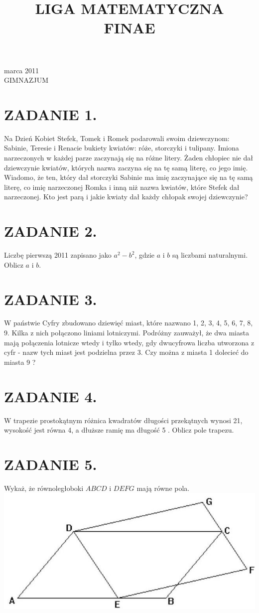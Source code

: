 \documentclass[10pt]{article}
\title{LIGA MATEMATYCZNA \\
 FINAE }
\author{}
\date{}
\begin{document}
 marca 2011\\
GIMNAZJUM

\section*{ZADANIE 1.}
Na Dzień Kobiet Stefek, Tomek i Romek podarowali swoim dziewczynom: Sabinie, Teresie i Renacie bukiety kwiatów: róże, storczyki i tulipany. Imiona narzeczonych w każdej parze zaczynają się na różne litery. Żaden chłopiec nie dał dziewczynie kwiatów, których nazwa zaczyna się na tę samą literę, co jego imię. Wiadomo, że ten, który dał storczyki Sabinie ma imię zaczynające się na tę samą literę, co imię narzeczonej Romka i inną niż nazwa kwiatów, które Stefek dał narzeczonej. Kto jest parą i jakie kwiaty dał każdy chłopak swojej dziewczynie?

\section*{ZADANIE 2.}
Liczbę pierwszą 2011 zapisano jako \(a^{2}-b^{2}\), gdzie \(a\) i \(b\) są liczbami naturalnymi. Oblicz \(a\) i \(b\).

\section*{ZADANIE 3.}
W państwie Cyfry zbudowano dziewięć miast, które nazwano 1, 2, 3, 4, 5, 6, 7, 8, 9. Kilka z nich połączono liniami lotniczymi. Podróżny zauważył, że dwa miasta mają połączenia lotnicze wtedy i tylko wtedy, gdy dwucyfrowa liczba utworzona z cyfr - nazw tych miast jest podzielna przez 3. Czy można z miasta 1 dolecieć do miasta 9 ?

\section*{ZADANIE 4.}
W trapezie prostokątnym różnica kwadratów długości przekątnych wynosi 21, wysokość jest równa 4, a dłuższe ramię ma długość 5 . Oblicz pole trapezu.

\section*{ZADANIE 5.}
Wykaż, że równoległoboki \(A B C D\) i \(D E F G\) mają równe pola.\\
\includegraphics[max width=\textwidth, center]{2024_11_21_553e22f22be5e1eb25b0g-1}
\end{document}
